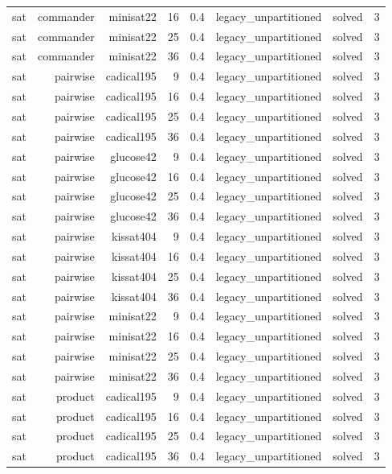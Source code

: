 \begin{tabular}{lrrrrrrr}
sat & commander & minisat22 & 16 & 0.4 & legacy\_unpartitioned & solved & 3 \\
sat & commander & minisat22 & 25 & 0.4 & legacy\_unpartitioned & solved & 3 \\
sat & commander & minisat22 & 36 & 0.4 & legacy\_unpartitioned & solved & 3 \\
sat & pairwise & cadical195 & 9 & 0.4 & legacy\_unpartitioned & solved & 3 \\
sat & pairwise & cadical195 & 16 & 0.4 & legacy\_unpartitioned & solved & 3 \\
sat & pairwise & cadical195 & 25 & 0.4 & legacy\_unpartitioned & solved & 3 \\
sat & pairwise & cadical195 & 36 & 0.4 & legacy\_unpartitioned & solved & 3 \\
sat & pairwise & glucose42 & 9 & 0.4 & legacy\_unpartitioned & solved & 3 \\
sat & pairwise & glucose42 & 16 & 0.4 & legacy\_unpartitioned & solved & 3 \\
sat & pairwise & glucose42 & 25 & 0.4 & legacy\_unpartitioned & solved & 3 \\
sat & pairwise & glucose42 & 36 & 0.4 & legacy\_unpartitioned & solved & 3 \\
sat & pairwise & kissat404 & 9 & 0.4 & legacy\_unpartitioned & solved & 3 \\
sat & pairwise & kissat404 & 16 & 0.4 & legacy\_unpartitioned & solved & 3 \\
sat & pairwise & kissat404 & 25 & 0.4 & legacy\_unpartitioned & solved & 3 \\
sat & pairwise & kissat404 & 36 & 0.4 & legacy\_unpartitioned & solved & 3 \\
sat & pairwise & minisat22 & 9 & 0.4 & legacy\_unpartitioned & solved & 3 \\
sat & pairwise & minisat22 & 16 & 0.4 & legacy\_unpartitioned & solved & 3 \\
sat & pairwise & minisat22 & 25 & 0.4 & legacy\_unpartitioned & solved & 3 \\
sat & pairwise & minisat22 & 36 & 0.4 & legacy\_unpartitioned & solved & 3 \\
sat & product & cadical195 & 9 & 0.4 & legacy\_unpartitioned & solved & 3 \\
sat & product & cadical195 & 16 & 0.4 & legacy\_unpartitioned & solved & 3 \\
sat & product & cadical195 & 25 & 0.4 & legacy\_unpartitioned & solved & 3 \\
sat & product & cadical195 & 36 & 0.4 & legacy\_unpartitioned & solved & 3 \\

\end{tabular}
